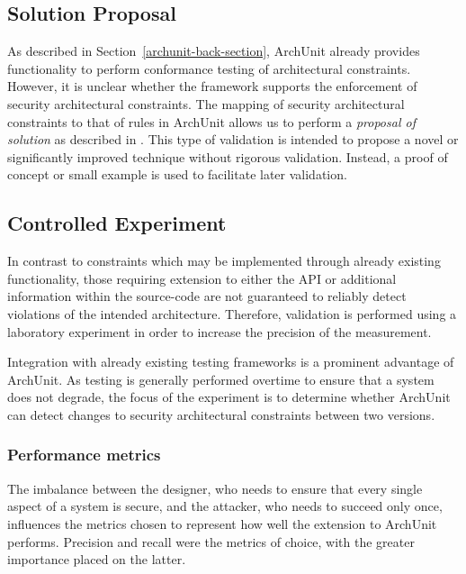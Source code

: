 \subsection{Solution Proposal}

As described in Section~\ref{archunit-back-section}, ArchUnit already provides functionality to perform conformance testing of architectural constraints. However, it is unclear whether the framework supports the enforcement of security architectural constraints. The mapping of security architectural constraints to that of rules in ArchUnit allows us to perform a \textit{proposal of solution} as described in \cite{wieringa_requirements_2006}. This type of validation is intended to propose a novel or significantly improved technique without rigorous validation. Instead, a proof of concept or small example is used to facilitate later validation. 

\subsection{Controlled Experiment} \label{sec-controlled-experiment}
In contrast to constraints which may be implemented through already existing functionality, those requiring extension to either the API or additional information within the source-code are not guaranteed to reliably detect violations of the intended architecture. Therefore, validation is performed using a laboratory experiment \cite{stol_abc_2018} in order to increase the precision of the measurement. 

Integration with already existing testing frameworks is a prominent advantage of ArchUnit. As testing is generally performed overtime to ensure that a system does not degrade, the focus of the experiment is to determine whether ArchUnit can detect changes to security architectural constraints between two versions. 

\subsubsection{Performance metrics}
The imbalance between the designer, who needs to ensure that every single aspect of a system is secure, and the attacker, who needs to succeed only once, influences the metrics chosen to represent how well the extension to ArchUnit performs. Precision and recall were the metrics of choice, with the greater importance placed on the latter. 


